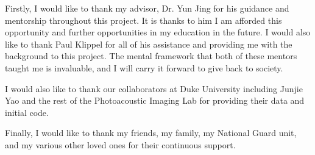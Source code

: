 Firstly, I would like to thank my advisor, Dr. Yun Jing for his guidance and mentorship throughout this project. It is thanks to him I am afforded this opportunity and further opportunities in my education in the future. I would also like to thank Paul Klippel for all of his assistance and providing me with the background to this project. The mental framework that both of these mentors taught me is invaluable, and I will carry it forward to give back to society. 

I would also like to thank our collaborators at Duke University including Junjie Yao and the rest of the Photoacoustic Imaging Lab for providing their data and initial code. 

Finally, I would like to thank my friends, my family, my National Guard unit, and my various other loved ones for their continuous support.